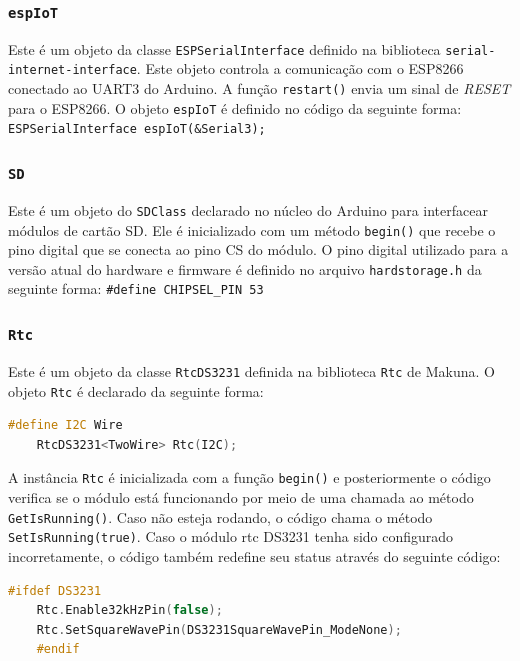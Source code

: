 \subsubsection{\texttt{espIoT}}

Este é um objeto da classe \texttt{ESPSerialInterface} definido na biblioteca \texttt{serial-internet-interface}. Este objeto controla a comunicação com o ESP8266 conectado ao UART3 do Arduino. A função \texttt{restart()} envia um sinal de \textit{RESET} para o ESP8266. O objeto \texttt{espIoT} é definido no código da seguinte forma: \texttt{ESPSerialInterface espIoT(\&Serial3);}

\subsubsection{\texttt{SD}}

Este é um objeto do \texttt{SDClass} declarado no núcleo do Arduino para interfacear módulos de cartão SD. Ele é inicializado com um método \texttt{begin()} que recebe o pino digital que se conecta ao pino CS do módulo. O pino digital utilizado para a versão atual do hardware e firmware é definido no arquivo \texttt{hardstorage.h} da seguinte forma: \texttt{\#define CHIPSEL\_PIN 53}

\subsubsection{\texttt{Rtc}}

Este é um objeto da classe \texttt{RtcDS3231} definida na biblioteca \texttt{Rtc} de Makuna. O objeto \texttt{Rtc} é declarado da seguinte forma: 

\begin{lstlisting}[language=C++]
    #define I2C Wire
    RtcDS3231<TwoWire> Rtc(I2C);
\end{lstlisting}

 A instância \texttt{Rtc} é inicializada com a função \texttt{begin()} e posteriormente o código verifica se o módulo está funcionando por meio de uma chamada ao método \texttt{GetIsRunning()}. Caso não esteja rodando, o código chama o método \texttt{SetIsRunning(true)}. Caso o módulo \acrshort{rtc} DS3231 tenha sido configurado incorretamente, o código também redefine seu status através do seguinte código: 

\begin{lstlisting}[language=C++]
    #ifdef DS3231
    Rtc.Enable32kHzPin(false);
    Rtc.SetSquareWavePin(DS3231SquareWavePin_ModeNone);
    #endif
\end{lstlisting}

